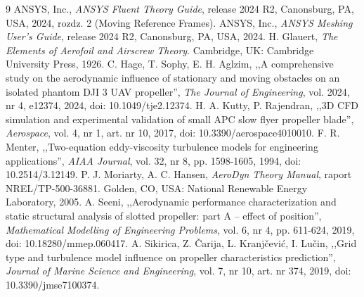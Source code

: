 \documentclass[12pt,a4paper,twoside]{article}
\begin{document}
	\begin{thebibliography}{9}
		 ANSYS, Inc., \textit{ANSYS Fluent Theory Guide}, release 2024 R2, Canonsburg, PA, USA, 2024, rozdz. 2 (Moving Reference Frames).
		 ANSYS, Inc., \textit{ANSYS Meshing User's Guide}, release 2024 R2, Canonsburg, PA, USA, 2024.
		 H. Glauert, \textit{The Elements of Aerofoil and Airscrew Theory}. Cambridge, UK: Cambridge University Press, 1926.
		 C. Hage, T. Sophy, E. H. Aglzim, ,,A comprehensive study on the aerodynamic influence of stationary and moving obstacles on an isolated phantom DJI 3 UAV propeller'', \textit{The Journal of Engineering}, vol. 2024, nr 4, e12374, 2024, doi: 10.1049/tje2.12374.
		 H. A. Kutty, P. Rajendran, ,,3D CFD simulation and experimental validation of small APC slow flyer propeller blade'', \textit{Aerospace}, vol. 4, nr 1, art. nr 10, 2017, doi: 10.3390/aerospace4010010.
		 F. R. Menter, ,,Two-equation eddy-viscosity turbulence models for engineering applications'', \textit{AIAA Journal}, vol. 32, nr 8, pp. 1598-1605, 1994, doi: 10.2514/3.12149.
		 P. J. Moriarty, A. C. Hansen, \textit{AeroDyn Theory Manual}, raport NREL/TP-500-36881. Golden, CO, USA: National Renewable Energy Laboratory, 2005.
		 A. Seeni, ,,Aerodynamic performance characterization and static structural analysis of slotted propeller: part A -- effect of position'', \textit{Mathematical Modelling of Engineering Problems}, vol. 6, nr 4, pp. 611-624, 2019, doi: 10.18280/mmep.060417.
		 A. Sikirica, Z. \v{C}arija, L. Kranj\v{c}evi\'{c}, I. Lu\v{c}in, ,,Grid type and turbulence model influence on propeller characteristics prediction'', \textit{Journal of Marine Science and Engineering}, vol. 7, nr 10, art. nr 374, 2019, doi: 10.3390/jmse7100374.
	\end{thebibliography}

	\clearpage
	\listoffigures
	\clearpage
	\listoftables
\end{document}

